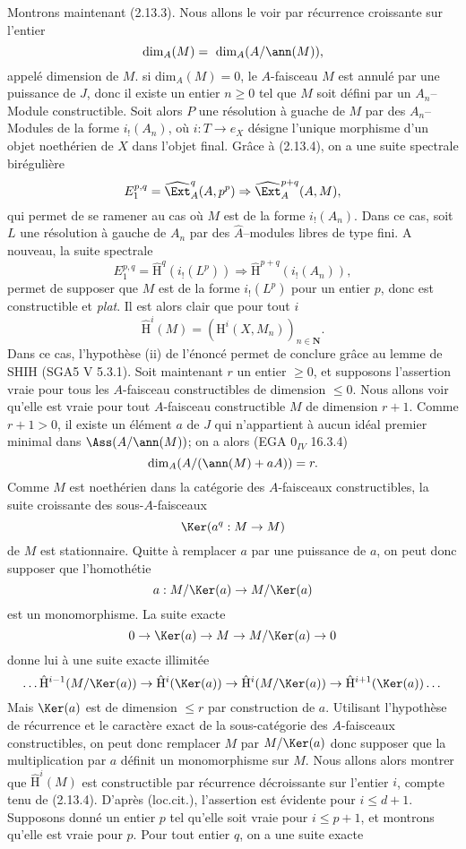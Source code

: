 Montrons maintenant (2.13.3). Nous allons le voir par récurrence croissante sur l'entier
$$
\text{dim}_A(M) =~\text{dim}_A(A/\ann(M)), 
$$
appelé dimension de $M$. si dim$_A(M) = 0$, le $A$-faisceau $M$ est annulé par une puissance de $J$, donc il existe un entier $n \geq 0$ tel que $M$ soit défini par un $A_n$--Module constructible. Soit alors $P$ une résolution à guache de $M$ par des $A_n$--Modules de la forme $i_!(A_n)$, où $i: T \to e_X$ désigne l'unique morphisme d'un objet noethérien de $X$ dans l'objet final. Grâce à (2.13.4), on a une suite spectrale birégulière
$$
E^{p, q}_1 = \widehat{\Ext}^q_A(A, p^p) \Rightarrow \widehat{\Ext}^{p+q}_A(A, M),
$$
qui permet de se ramener au cas où $M$ est de la forme $i_!(A_n)$. Dans ce cas, soit $L$ une résolution à gauche de $A_n$ par des $\hat{A}$--modules libres de type fini. A nouveau, la suite spectrale
$$
E^{p, q}_1 = \hat{\mathrm{H}}^q(i_!(L^p)) \Rightarrow \hat{\mathrm{H}}^{p+q}(i_!(A_n)),
$$
permet de supposer que $M$ est de la forme $i_!(L^p)$ pour un entier $p$, donc est constructible et \emph{plat}. Il est alors clair que pour tout $i$
$$
\hat{\mathrm{H}}^i(M) = (\mathrm{H}^i(X, M_n))_{n \in \mathbf{N}}.
$$
Dans ce cas, l'hypothèse (ii) de l'énoncé permet de conclure grâce au lemme de SHIH (SGA5 V 5.3.1). Soit maintenant $r$ un entier $\geq 0$, et supposons l'assertion vraie pour tous les $A$-faisceau constructibles de dimension $\leq 0$. Nous allons voir qu'elle est vraie pour tout $A$-faisceau constructible $M$ de dimension $r+1$. Comme $r+1 > 0$, il existe un élément $a$ de $J$ qui n'appartient à aucun idéal premier minimal dans $\Ass(A/\ann(M))$; on a alors (EGA $0_{IV}$ 16.3.4)
$$
\text{dim}_A(A/(\ann(M) + aA)) = r.
$$
Comme $M$ est noethérien dans la catégorie des $A$-faisceaux constructibles, la suite croissante des sous-$A$-faisceaux
$$
\Ker(a^q: M \to M)
$$
de $M$ est stationnaire. Quitte à remplacer $a$ par une puissance de $a$, on peut donc supposer que l'homothétie
$$
a: M/\Ker(a) \to M/\Ker(a)
$$
est un monomorphisme. La suite exacte
$$
0 \to \Ker(a) \to M \to M/\Ker(a) \to 0
$$
donne lui à une suite exacte illimitée
$$
\dots \hat{\mathrm{H}}^{i-1}(M/\Ker(a)) \to \hat{\mathrm{H}}^i(\Ker(a)) \to \hat{\mathrm{H}}^i(M/\Ker(a)) \to \hat{\mathrm{H}}^{i+1}(\Ker(a)) \dots 
$$
Mais $\Ker(a)$ est de dimension $\leq r$ par construction de $a$. Utilisant l'hypothèse de récurrence et le caractère exact de la sous-catégorie des $A$-faisceaux constructibles, on peut donc remplacer $M$ par $M/\Ker(a)$ donc supposer que la multiplication par $a$ définit un monomorphisme sur $M$. Nous allons alors montrer que $\hat{\mathrm{H}}^i(M)$ est constructible par récurrence décroissante sur l'entier $i$, compte tenu de (2.13.4). D'après (loc.cit.), l'assertion est évidente pour $i \leq d+1$. Supposons donné un entier $p$ tel qu'elle soit vraie pour $i \leq p+1$, et montrons qu'elle est vraie pour $p$. Pour tout entier $q$, on a une suite exacte
